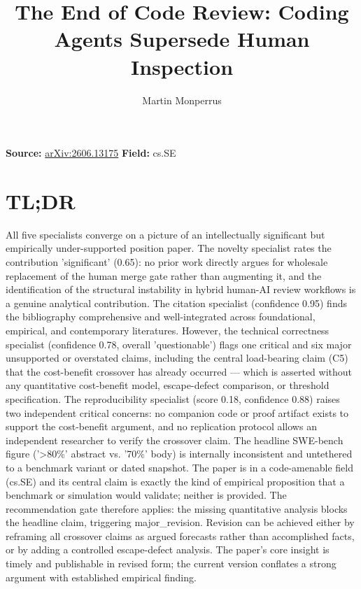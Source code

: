 \documentclass[11pt]{article}
\title{The End of Code Review: Coding Agents Supersede Human Inspection}
\author{Martin Monperrus}
\date{}
\begin{document}
\maketitle

\noindent\textbf{Source:} \href{https://arxiv.org/abs/2606.13175}{arXiv:2606.13175} \quad \textbf{Field:} cs.SE\\

\section*{TL;DR}
All five specialists converge on a picture of an intellectually significant but empirically under-supported position paper. The novelty specialist rates the contribution 'significant' (0.65): no prior work directly argues for wholesale replacement of the human merge gate rather than augmenting it, and the identification of the structural instability in hybrid human-AI review workflows is a genuine analytical contribution. The citation specialist (confidence 0.95) finds the bibliography comprehensive and well-integrated across foundational, empirical, and contemporary literatures. However, the technical correctness specialist (confidence 0.78, overall 'questionable') flags one critical and six major unsupported or overstated claims, including the central load-bearing claim (C5) that the cost-benefit crossover has already occurred --- which is asserted without any quantitative cost-benefit model, escape-defect comparison, or threshold specification. The reproducibility specialist (score 0.18, confidence 0.88) raises two independent critical concerns: no companion code or proof artifact exists to support the cost-benefit argument, and no replication protocol allows an independent researcher to verify the crossover claim. The headline SWE-bench figure ('>80\%' abstract vs. '70\%' body) is internally inconsistent and untethered to a benchmark variant or dated snapshot. The paper is in a code-amenable field (cs.SE) and its central claim is exactly the kind of empirical proposition that a benchmark or simulation would validate; neither is provided. The recommendation gate therefore applies: the missing quantitative analysis blocks the headline claim, triggering major\_revision. Revision can be achieved either by reframing all crossover claims as argued forecasts rather than accomplished facts, or by adding a controlled escape-defect analysis. The paper's core insight is timely and publishable in revised form; the current version conflates a strong argument with established empirical finding.
\end{document}
